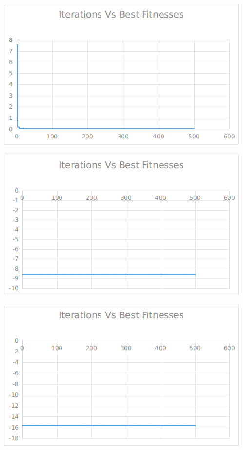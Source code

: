 \documentclass[12pt]{article}
\begin{document}
					\hfill
					\begin{minipage}{0.6\linewidth}
						\includegraphics[width=\linewidth]{30.png}
					\end{minipage}
					\begin{minipage}{0.6\linewidth}
						\includegraphics[width=\linewidth]{31.png}
					\end{minipage}
					\hfill
					\begin{minipage}{0.6\linewidth}
						\includegraphics[width=\linewidth]{32.png}
					\end{minipage}
\end{document}
